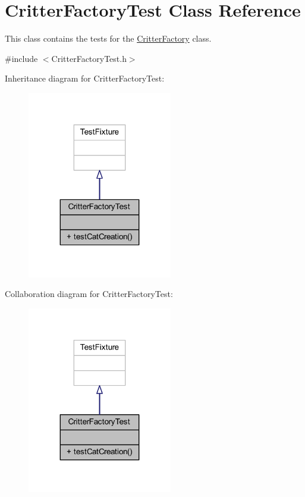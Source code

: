 \hypertarget{class_critter_factory_test}{\section{Critter\+Factory\+Test Class Reference}
\label{class_critter_factory_test}
}


This class contains the tests for the \hyperlink{class_critter_factory}{Critter\+Factory} class.  




{\ttfamily \#include $<$Critter\+Factory\+Test.\+h$>$}



Inheritance diagram for Critter\+Factory\+Test\+:
\nopagebreak
\begin{figure}[H]
\begin{center}
\leavevmode
\includegraphics[width=179pt]{class_critter_factory_test__inherit__graph}
\end{center}
\end{figure}


Collaboration diagram for Critter\+Factory\+Test\+:
\nopagebreak
\begin{figure}[H]
\begin{center}
\leavevmode
\includegraphics[width=179pt]{class_critter_factory_test__coll__graph}
\end{center}
\end{figure}
